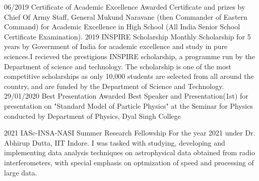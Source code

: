 \documentclass[9pt]{developercv} %
\begin{document}


\begin{entrylist}
	\entry
		{06/2019}
		{Certificate of Academic Excellence}
		{}
		{Awarded Certificate and prizes by Chief Of Army Staff, General Mukund Naravane (then Commander of Eastern Command) for Academic Excellence in High School (All India Senior School Certificate Examination).}
	\entry
		{2019}
		{INSPIRE Scholarship}
		{}
		{Monthly Scholarship for 5 years by Government of India for academic excellence and study in pure sciences.I recieved the prestigious INSPIRE scholarship, a programme run by the Department of science and technology. The scholarship is one of the most competitive scholarships as only 10,000 students are selected from all around the country, and are funded by the Department of Science and Technology.}
	\entry
		{29/01/2020}
		{Best Presentation}
		{}
		{Awarded Best Speaker and Presentation(1st) for presentation on "Standard Model of Particle Physics" at the Seminar for Physics conducted by Department of Physics, Dyal Singh College}

	\entry
		{2021}
		{IASc-INSA-NASI Summer Research Fellowship}
		{}
		{For the year 2021 under Dr. Abhirup Dutta, IIT Indore. I was tasked with studying, developing and implementing data analysis techniques on astrophysical data obtained from radio interferometers, with special emphasis on optmization of speed and processing of large data.}
		
\end{entrylist}




%
%	
%	
%	
	
\end{document}
